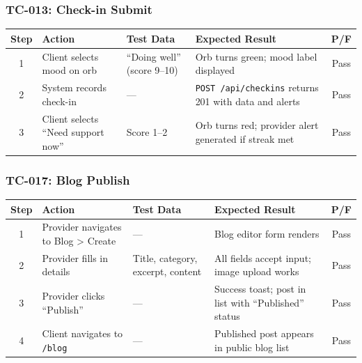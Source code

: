 \documentclass[12pt,letterpaper]{article}
\begin{document}
\subsubsection*{TC-013: Check-in Submit}

\begin{table}[H]
\centering
\small
\begin{tabularx}{\textwidth}{|c|>{\raggedright\arraybackslash}X|>{\raggedright\arraybackslash}p{3cm}|>{\raggedright\arraybackslash}X|c|}
\hline
\rowcolor{TableHeader}\textcolor{TableHeaderText}{\textbf{Step}} & \textcolor{TableHeaderText}{\textbf{Action}} & \textcolor{TableHeaderText}{\textbf{Test Data}} & \textcolor{TableHeaderText}{\textbf{Expected Result}} & \textcolor{TableHeaderText}{\textbf{P/F}} \\
\hline
1 & Client selects mood on orb & ``Doing well'' (score 9--10) & Orb turns green; mood label displayed & Pass \\
\hline
\rowcolor{TableRowAlt}
2 & System records check-in & --- & \texttt{POST /api/checkins} returns 201 with data and alerts & Pass \\
\hline
3 & Client selects ``Need support now'' & Score 1--2 & Orb turns red; provider alert generated if streak met & Pass \\
\hline
\end{tabularx}
\end{table}

\subsubsection*{TC-017: Blog Publish}

\begin{table}[H]
\centering
\small
\begin{tabularx}{\textwidth}{|c|>{\raggedright\arraybackslash}X|>{\raggedright\arraybackslash}p{3cm}|>{\raggedright\arraybackslash}X|c|}
\hline
\rowcolor{TableHeader}\textcolor{TableHeaderText}{\textbf{Step}} & \textcolor{TableHeaderText}{\textbf{Action}} & \textcolor{TableHeaderText}{\textbf{Test Data}} & \textcolor{TableHeaderText}{\textbf{Expected Result}} & \textcolor{TableHeaderText}{\textbf{P/F}} \\
\hline
1 & Provider navigates to Blog > Create & --- & Blog editor form renders & Pass \\
\hline
\rowcolor{TableRowAlt}
2 & Provider fills in details & Title, category, excerpt, content & All fields accept input; image upload works & Pass \\
\hline
3 & Provider clicks ``Publish'' & --- & Success toast; post in list with ``Published'' status & Pass \\
\hline
\rowcolor{TableRowAlt}
4 & Client navigates to \texttt{/blog} & --- & Published post appears in public blog list & Pass \\
\hline
\end{tabularx}
\end{table}
\end{document}
